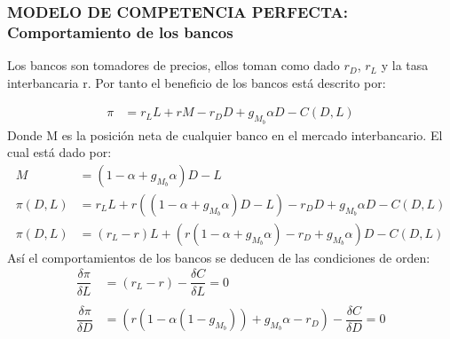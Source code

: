 \documentclass[10pt, xcolor=table, x11names]{beamer}
\begin{document}
\begin{frame}
    \frametitle{{\normalsize MODELO DE COMPETENCIA PERFECTA: Comportamiento de los bancos} {}}
    
    Los bancos son tomadores de precios, ellos toman como dado $r_{D}$, $r_{L}$ y la tasa interbancaria r. Por tanto el beneficio de los bancos está descrito por:
    
   \begin{align}
   \pi&=r_{L}L+rM-r_{D}D+g_{M_{b}}\alpha D-C(D,L) \nonumber
   \end{align}    
    Donde M es la posición neta de cualquier banco en el mercado interbancario. El cual está dado por:
    \begin{align}
    M&=(1-\alpha+g_{M_{b}}\alpha)D-L \nonumber\\
    \pi(D,L)&=r_{L}L+r((1-\alpha+g_{M_{b}}\alpha)D-L)-r_{D}D+g_{M_{b}}\alpha D-C(D,L) \nonumber \\
    \pi(D,L)&=(r_{L}-r)L+(r(1-\alpha+g_{M_{b}}\alpha)-r_{D}+g_{M_{b}}\alpha)D-C(D,L) 
    \end{align} 
    Así el comportamientos de los bancos se deducen de las condiciones de orden:
    \begin{align}
    \dfrac{\delta \pi}{\delta L}&=(r_{L}-r)-\dfrac{\delta C}{\delta L}=0  \nonumber \\
    & \\
    \dfrac{\delta \pi}{\delta D}&=(r(1-\alpha(1-g_{M_{b}}))+g_{M_{b}}\alpha-r_{D})-\dfrac{\delta C}{\delta D}=0  \nonumber
    \end{align} 
    
    
    
\end{frame}
\end{document}
